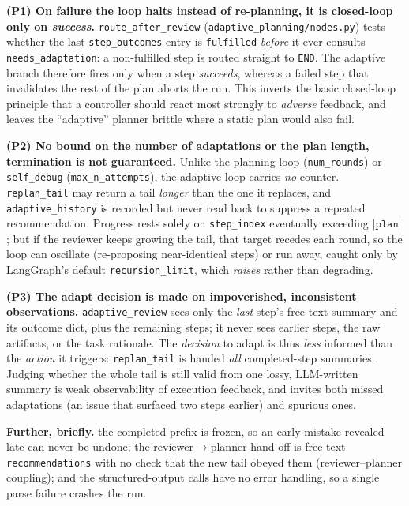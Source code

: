\documentclass[11pt,a4paper]{article}
\begin{document}
\textbf{(P1) On failure the loop halts instead of re-planning, it is closed-loop only on \emph{success}.}
\texttt{route\_after\_review} (\texttt{adaptive\_planning/nodes.py}) tests whether the last
\texttt{step\_outcomes} entry is \texttt{fulfilled} \emph{before} it ever consults
\texttt{needs\_adaptation}: a non-fulfilled step is routed straight to \texttt{END}. The adaptive branch
therefore fires only when a step \emph{succeeds}, whereas a failed step that invalidates the rest of the plan 
aborts the run. This inverts the basic
closed-loop principle that a controller should react most strongly to \emph{adverse} feedback, and leaves
the ``adaptive'' planner brittle where a static plan would also fail.

\textbf{(P2) No bound on the number of adaptations or the plan length, termination is not guaranteed.}
Unlike the planning loop (\texttt{num\_rounds}) or \texttt{self\_debug} (\texttt{max\_n\_attempts}), the
adaptive loop carries \emph{no} counter. \texttt{replan\_tail} may return a tail \emph{longer} than the one
it replaces, and \texttt{adaptive\_history} is recorded but never read back to suppress a repeated
recommendation. Progress rests solely on \texttt{step\_index} eventually exceeding $|\texttt{plan}|$; but if
the reviewer keeps growing the tail, that target recedes each round, so the loop can oscillate
(re-proposing near-identical steps) or run away, caught only by LangGraph's default
\texttt{recursion\_limit}, which \emph{raises} rather than degrading.

\textbf{(P3) The adapt decision is made on impoverished, inconsistent observations.}
\texttt{adaptive\_review} sees only the \emph{last} step's free-text summary and its outcome dict, plus the
remaining steps; it never sees earlier steps, the raw artifacts, or the task rationale. The \emph{decision}
to adapt is thus \emph{less} informed than the \emph{action} it triggers: \texttt{replan\_tail} is handed
\emph{all} completed-step summaries. Judging whether the whole tail is still valid from one lossy,
LLM-written summary is weak observability of execution feedback, and invites both missed adaptations (an
issue that surfaced two steps earlier) and spurious ones.

\textbf{Further, briefly.} the completed prefix is frozen, so an early mistake revealed late can never be
undone; the reviewer$\to$planner hand-off is free-text \texttt{recommendations} with no check that the new
tail obeyed them (reviewer--planner coupling); and the structured-output calls have no error handling, so a
single parse failure crashes the run.
\end{document}
